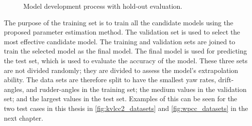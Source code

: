 \begin{figure}[H]
\centering
{}
\caption{Model development process with hold-out evaluation.}
\label{fig:model_development_process}
\end{figure}

\noindent The purpose of the training set is to train all the candidate models using the proposed parameter estimation method. The validation set is used to select the most effective candidate model. The training and validation sets are joined to train the selected model as the final model. The final model is used for predicting the test set, which is used to evaluate the accuracy of the model. These three sets are not divided randomly;  they are divided to assess the model’s extrapolation ability. The data sets are therefore split to have the smallest yaw rates, drift-angles, and rudder-angles in the training set; the medium values in the validation set; and the largest values in the test set.
Examples of this can be seen for the two test cases in this thesis in \autoref{fig:kvlcc2_datasets} and  \autoref{fig:wpcc_datasets} in the next chapter.


